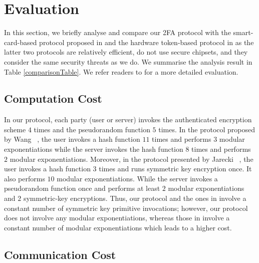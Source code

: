 
\section{Evaluation}\label{sec:eval}

In this section, we briefly analyse and compare our 2FA protocol with the smart-card-based protocol proposed in  \cite{WangW18} and the hardware token-based protocol in \cite{JareckiJKSS21} as the latter two protocols are relatively efficient, do not use secure chipsets, and they consider the same security threats as we do. We summarise the analysis result in Table \ref{comparisonTable}. We refer readers to  for a more detailed evaluation. 







\subsection{Computation Cost}

In our protocol, each party (user or server) invokes the authenticated encryption scheme $4$ times and the pseudorandom function $5$ times. In the protocol proposed by Wang \etal~\cite{WangW18}, the user invokes a hash function $11$ times and performs $3$ modular exponentiations while the server invokes the hash function $8$ times and performs $2$ modular exponentiations. Moreover, in the protocol presented by Jarecki \etal~\cite{JareckiJKSS21}, the user invokes a hash function $3$ times and runs symmetric key encryption once. It also performs $10$ modular exponentiations. While the server invokes a pseudorandom function once and performs at least $2$ modular exponentiations and $2$ symmetric-key encryptions. Thus,  our protocol and the ones in \cite{WangW18,JareckiJKSS21} involve a constant number of symmetric key primitive invocations; however, our protocol does not involve any modular exponentiations, whereas those in  \cite{WangW18,JareckiJKSS21} involve a constant number of modular exponentiations which leads to a higher cost. 

\subsection{Communication Cost}

